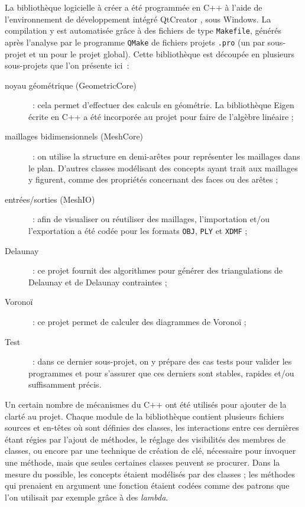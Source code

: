 \documentclass[12pt,a4paper]{report}
\begin{document}
La bibliothèque logicielle à créer a été programmée en C++ à l'aide de l'environnement de développement intégré QtCreator \cite{QtCreator}, sous Windows. La compilation y est automatisée grâce à des fichiers de type \verb+Makefile+, générés après l'analyse par le programme \verb+QMake+ de fichiers projets \verb+.pro+ (un par sous-projet et un pour le projet global).
Cette bibliothèque est découpée en plusieurs sous-projets que l'on présente ici~:
\begin{description}
\item[noyau géométrique (GeometricCore)]~: cela permet d'effectuer des calculs en géométrie. La bibliothèque Eigen \cite{Eigen} écrite en C++ a été incorporée au projet pour faire de l'algèbre linéaire ;
\item[maillages bidimensionnels (MeshCore)]~: on utilise la structure en demi-arêtes pour représenter les maillages dans le plan. D'autres classes modélisant des concepts ayant trait aux maillages y figurent, comme des propriétés concernant des faces ou des arêtes ;
\item[entrées/sorties (MeshIO)]~: afin de visualiser ou réutiliser des maillages, l'importation et/ou l'exportation a été codée pour les formats \verb+OBJ+, \verb+PLY+ et \verb+XDMF+\footnotemark {} ;
\item[Delaunay]~: ce projet fournit des algorithmes pour générer des triangulations de Delaunay et de Delaunay contraintes ;
\item[Voronoï]~: ce projet permet de calculer des diagrammes de Voronoï ;
\item[Test]~: dans ce dernier sous-projet, on y prépare des cas tests pour valider les programmes et pour s'assurer que ces derniers sont stables, rapides et/ou suffisamment précis.
\end{description}



Un certain nombre de mécanismes du C++ ont été utilisés pour ajouter de la clarté au projet. Chaque module de la bibliothèque contient plusieurs fichiers sources et en-têtes où sont définies des classes, les interactions entre ces dernières étant régies par l'ajout de méthodes, le réglage des visibilités des membres de classes, ou encore par une technique de création de clé, nécessaire pour invoquer une méthode, mais que seules certaines classes peuvent se procurer. Dans la mesure du possible, les concepts étaient modélisés par des classes ; les méthodes qui prenaient en argument une fonction étaient codées comme des patrons que l'on utilisait par exemple grâce à des \emph{lambda}.
\end{document}
